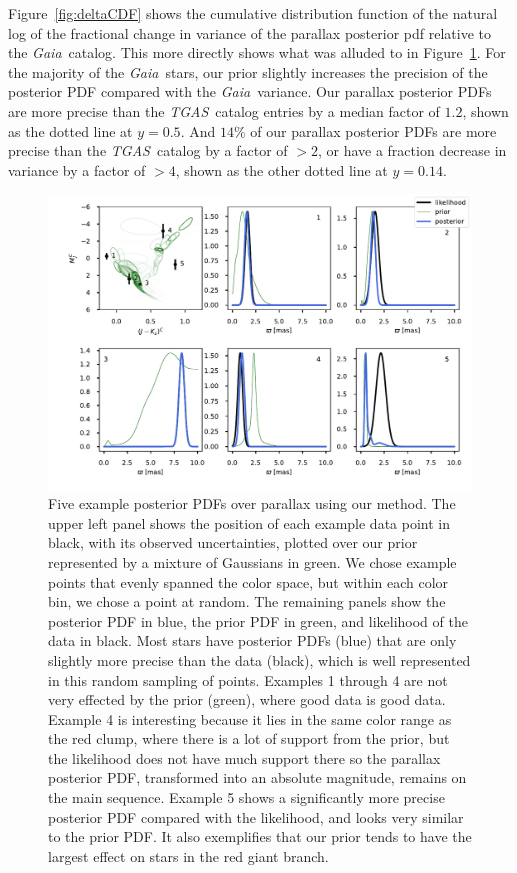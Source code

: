 \documentclass[modern]{aastex61}
\newcommand{\acronym}[1]{{\small{#1}}}
\newcommand{\project}[1]{\textsl{#1}}
\newcommand{\tgas}{\project{\acronym{TGAS}}}
\newcommand{\gaia}{\project{Gaia}}
\begin{document}
Figure~\ref{fig:deltaCDF} shows the cumulative distribution function of the natural log of the fractional change in variance of the parallax posterior pdf relative to the \gaia\ catalog. This more directly shows what was alluded to in Figure~\ref{fig:posterior}. For the majority of the \gaia\ stars, our prior slightly increases the precision of the posterior PDF compared with the \gaia\ variance. Our parallax posterior PDFs are more precise than the \tgas\ catalog entries by a median factor of $1.2$, shown as the dotted line at $y=0.5$.
And $14\%$ of our parallax posterior PDFs are more precise than the \tgas\ catalog by a factor of $>2$, or have a fraction decrease in variance by a factor of $>4$, shown as the other dotted line at $y=0.14$.


\begin{figure}
\centering
  \includegraphics[width=\textwidth]{posterior.pdf}
\caption{Five example posterior PDFs over parallax using our method.
The upper left panel shows the position of each example data point in black, with its observed uncertainties, plotted over our prior represented by a mixture of Gaussians in green.
We chose example points that evenly spanned the color space, but within each color bin, we chose a point at random.
The remaining panels show the posterior PDF in blue, the prior PDF in green, and likelihood of the data in black.
Most stars have posterior PDFs (blue) that are only slightly more precise than the data (black), which is well represented in this random sampling of points.
Examples 1 through 4 are not very effected by the prior (green), where good data is good data.
Example 4 is interesting because it lies in the same color range as the red clump, where there is a lot of support from the prior, but the likelihood does not have much support there so the parallax posterior PDF, transformed into an absolute magnitude, remains on the main sequence.
Example 5 shows a significantly more precise posterior PDF compared with the likelihood, and looks very similar to the prior PDF.
It also exemplifies that our prior tends to have the largest effect on stars in the red giant branch.}
\label{fig:posterior}
\end{figure}
\end{document}
